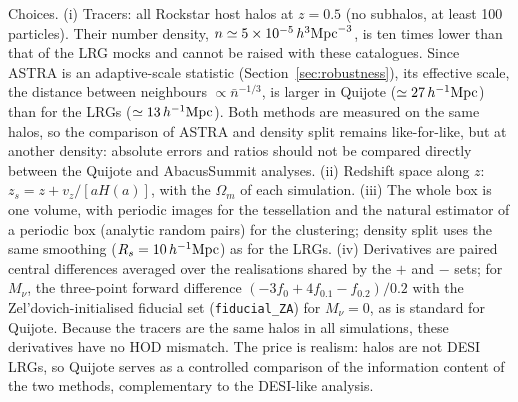 Choices. (i) Tracers: all Rockstar host halos at $z=0.5$ (no subhalos, at least 100 particles). Their number density, $n\simeq5\times10^{-5}\,h^3{\rm Mpc}^{-3}$, is ten times lower than that of the LRG mocks and cannot be raised with these catalogues. Since ASTRA is an adaptive-scale statistic (Section~\ref{sec:robustness}), its effective scale, the distance between neighbours $\propto\bar n^{-1/3}$, is larger in Quijote ($\simeq27\,h^{-1}\mathrm{Mpc}$) than for the LRGs ($\simeq13\,h^{-1}\mathrm{Mpc}$). Both methods are measured on the same halos, so the comparison of ASTRA and density split remains like-for-like, but at another density: absolute errors and ratios should not be compared directly between the Quijote and AbacusSummit analyses. (ii) Redshift space along $z$: $z_s = z + v_z/[aH(a)]$, with the $\Omega_m$ of each simulation. (iii) The whole box is one volume, with periodic images for the tessellation and the natural estimator of a periodic box (analytic random pairs) for the clustering; density split uses the same smoothing ($R_s=10\,h^{-1}\mathrm{Mpc}$) as for the LRGs. (iv) Derivatives are paired central differences averaged over the realisations shared by the $+$ and $-$ sets; for $M_\nu$, the three-point forward difference $(-3f_0+4f_{0.1}-f_{0.2})/0.2$ with the Zel'dovich-initialised fiducial set (\texttt{fiducial\_ZA}) for $M_\nu=0$, as is standard for Quijote. Because the tracers are the same halos in all simulations, these derivatives have no HOD mismatch. The price is realism: halos are not DESI LRGs, so Quijote serves as a controlled comparison of the information content of the two methods, complementary to the DESI-like analysis.


